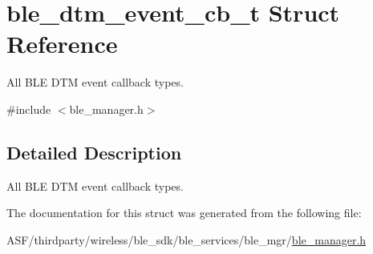 \hypertarget{structble__dtm__event__cb__t}{}\section{ble\+\_\+dtm\+\_\+event\+\_\+cb\+\_\+t Struct Reference}
\label{structble__dtm__event__cb__t}


All B\+LE D\+TM event callback types.  




{\ttfamily \#include $<$ble\+\_\+manager.\+h$>$}



\subsection{Detailed Description}
All B\+LE D\+TM event callback types. 

The documentation for this struct was generated from the following file\+:\begin{DoxyCompactItemize}
\item 
A\+S\+F/thirdparty/wireless/ble\+\_\+sdk/ble\+\_\+services/ble\+\_\+mgr/\mbox{\hyperlink{ble__manager_8h}{ble\+\_\+manager.\+h}}\end{DoxyCompactItemize}
